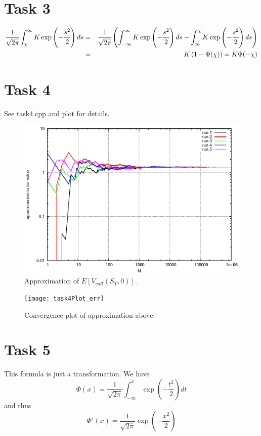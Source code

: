 \documentclass[]{article}
\begin{document}
\section*{Task 3}
\begin{eqnarray*}
\cfrac{1}{\sqrt{2\pi}}\int_{\chi}^{\infty}K\exp\left(-\cfrac{s^2}{2}\right)ds &
= & \cfrac{1}{\sqrt{2\pi}}\left(\int_{-\infty}^{\infty}K\exp\left(-\cfrac{s^2}{2}\right)ds
- \int_{\infty}^{\chi}K\exp\left(-\cfrac{s^2}{2}\right)ds \right) \\
& = & K\left(1 - \Phi(\chi)\right) = K \Phi(-\chi)
\end{eqnarray*}

\section*{Task 4}
See task4.cpp and plot for details. 
\begin{figure}[!ht]
\centering
\includegraphics{task4Plot}
\caption{Approximation of $E\left[V_{call}(S_T,0)\right]$.}
\label{fig:Task4a}
\end{figure}
\begin{figure}[!ht]
\centering
\texttt{[image: task4Plot\_err]}
\caption{Convergence plot of approximation above.}
\label{fig:Task4b}
\end{figure}
\clearpage

\section*{Task 5} This formula is just a transformation. We have
\[\Phi(x)=\dfrac{1}{\sqrt{2\pi}}\int_{-\infty}^x
\exp\left({-\dfrac{t^2}{2}}\right)dt\] 
and thus
\[\Phi'(x)=\dfrac{1}{\sqrt{2\pi}}\exp\left({-\dfrac{x^2}{2}}\right)\]
\end{document}
